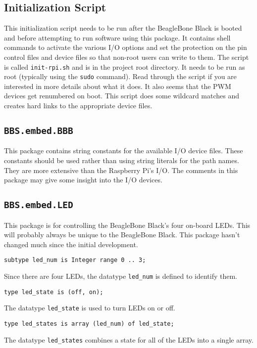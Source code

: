 \documentclass[10pt, openany]{book}
\newcommand{\indextype}[1]{\index[type]{#1}}
\newcommand{\package}[1]{\texttt{#1}}
\newcommand{\datatype}[1]{\texttt{#1}}
\newcommand{\filename}[1]{\texttt{#1}}
\newcommand{\cli}[1]{\texttt{#1}}
\begin{document}
\subsection{Initialization Script}
This initialization script needs to be run after the BeagleBone Black is booted and before attempting to run software using this package.  It contains shell commands to activate the various I/O options and set the protection on the pin control files and device files so that non-root users can write to them.  The script is called \filename{init-rpi.sh} and is in the project root directory.  It needs to be run as root (typically using the \cli{sudo} command).  Read through the script if you are interested in more details about what it does.  It also seems that the PWM devices get renumbered on boot.  This script does some wildcard matches and creates hard links to the appropriate device files.

\subsection{\package{BBS.embed.BBB}}
This package contains string constants for the available I/O device files.  These constants should be used rather than using string literals for the path names.  They are more extensive than the Raspberry Pi's I/O.  The comments in this package may give some insight into the I/O devices.

\subsection{\package{BBS.embed.LED}}
This package is for controlling the BeagleBone Black's four on-board LEDs.  This will probably always be unique to the BeagleBone Black.  This package hasn't changed much since the initial development.
\begin{lstlisting}
subtype led_num is Integer range 0 .. 3;
\end{lstlisting}
\indextype{led\_num}
Since there are four LEDs, the datatype \datatype{led\_num} is defined to identify them.

\begin{lstlisting}
type led_state is (off, on);
\end{lstlisting}
\indextype{led\_state}
The datatype \datatype{led\_state} is used to turn LEDs on or off.

\begin{lstlisting}
type led_states is array (led_num) of led_state;
\end{lstlisting}
\indextype{led\_states}
The datatype \datatype{led\_states} combines a state for all of the LEDs into a single array.
\end{document}
